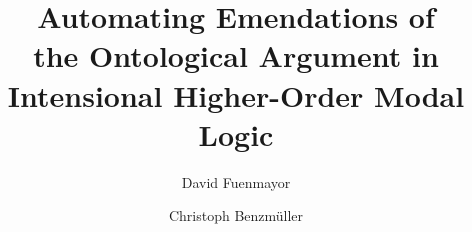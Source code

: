 \documentclass{llncs}
\begin{document}
%
\frontmatter          %
%
\pagestyle{headings}  %

%
\mainmatter              %
%
\title{Automating Emendations of \\
	the Ontological Argument in\\
	Intensional Higher-Order Modal Logic}
%
\author{David Fuenmayor \and Christoph Benzm\"uller}
%

%

\maketitle              %







%




%
\end{document}
